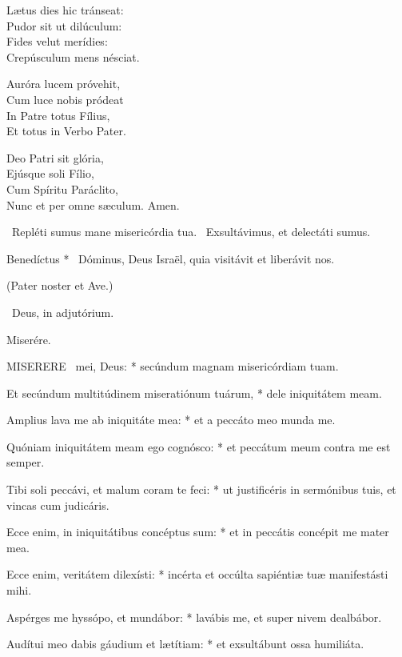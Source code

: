 Lætus dies hic tránseat:\\
Pudor sit ut dilúculum:\\
Fides velut merídies:\\
Crepúsculum mens nésciat.

Auróra lucem próvehit,\\
Cum luce nobis pródeat\\
In Patre totus Fílius,\\
Et totus in Verbo Pater.

Deo Patri sit glória,\\
Ejúsque soli Fílio,\\
Cum Spíritu Paráclito,\\
Nunc et per omne sæculum. Amen.

\V\ Repléti sumus mane misericórdia tua. \R\ Exsultávimus, et delectáti sumus.

 Benedíctus * \textdagger\ Dóminus, Deus Israël, quia visitávit et liberávit nos.




(Pater noster et Ave.)

\V\ Deus, in adjutórium.

 Miserére. \textdagger


\lettrine[lines=2]{M}{ISERERE} \textdagger\ mei, Deus: * secúndum magnam misericórdiam tuam.

Et secúndum multitúdinem miseratiónum tuárum, * dele iniquitátem meam.

Amplius lava me ab iniquitáte mea: * et a peccáto meo munda me.

Quóniam iniquitátem meam ego cognósco: * et peccátum meum contra me est semper.

Tibi soli peccávi, et malum coram te feci: * ut justificéris in sermónibus tuis, et vincas cum judicáris.

Ecce enim, in iniquitátibus concéptus sum: * et in peccátis concépit me mater mea.

Ecce enim, veritátem dilexísti: * incérta et occúlta sapiéntiæ tuæ manifestásti mihi.

Aspérges me hyssópo, et mundábor: * lavábis me, et super nivem dealbábor.

Audítui meo dabis gáudium et lætítiam: * et exsultábunt ossa humiliáta.

